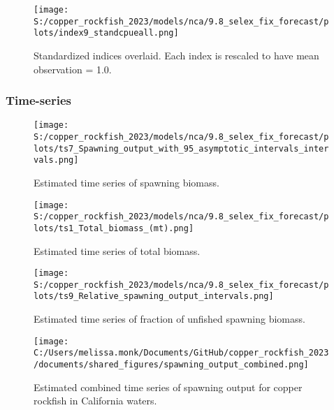 \documentclass[11pt,
  english,
  letterpaper,
]{article}
\begin{document}
\pagebreak

\begin{figure}
\centering
\texttt{[image: S:/copper\_rockfish\_2023/models/nca/9.8\_selex\_fix\_forecast/plots/index9\_standcpueall.png]}
\caption{Standardized indices overlaid. Each index is rescaled to have mean observation = 1.0.\label{fig:standardized-indices}}
\end{figure}

\pagebreak

\hypertarget{time-series}{%
\subsubsection{Time-series}\label{time-series}}

\begin{figure}
\centering
\texttt{[image: S:/copper\_rockfish\_2023/models/nca/9.8\_selex\_fix\_forecast/plots/ts7\_Spawning\_output\_with\_95\_asymptotic\_intervals\_intervals.png]}
\caption{Estimated time series of spawning biomass.\label{fig:ssb}}
\end{figure}

\pagebreak

\begin{figure}
\centering
\texttt{[image: S:/copper\_rockfish\_2023/models/nca/9.8\_selex\_fix\_forecast/plots/ts1\_Total\_biomass\_(mt).png]}
\caption{Estimated time series of total biomass.\label{fig:tot-bio}}
\end{figure}

\pagebreak

\begin{figure}
\centering
\texttt{[image: S:/copper\_rockfish\_2023/models/nca/9.8\_selex\_fix\_forecast/plots/ts9\_Relative\_spawning\_output\_intervals.png]}
\caption{Estimated time series of fraction of unfished spawning biomass.\label{fig:depl}}
\end{figure}

\pagebreak

\begin{figure}
\centering
\texttt{[image: C:/Users/melissa.monk/Documents/GitHub/copper\_rockfish\_2023/documents/shared\_figures/spawning\_output\_combined.png]}
\caption{Estimated combined time series of spawning output for copper rockfish in California waters.\label{fig:sb-all}}
\end{figure}
\end{document}
